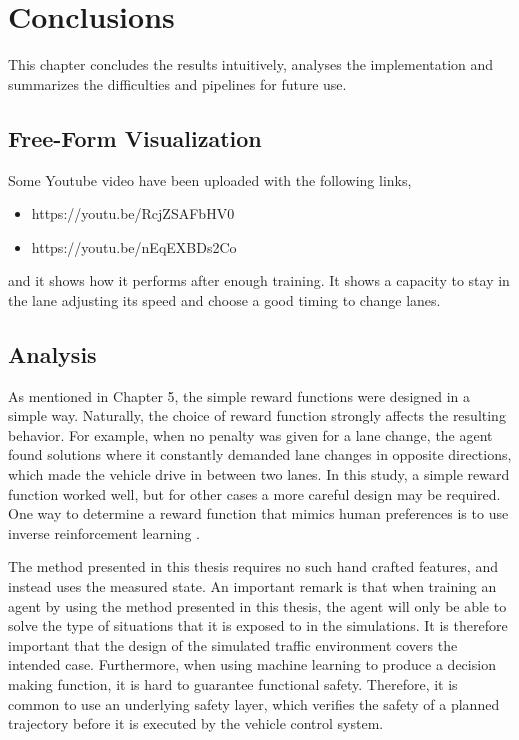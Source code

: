 \chapter{Conclusions}

This chapter concludes the results intuitively, analyses the implementation and summarizes the difficulties and pipelines for future use.

\section{Free-Form Visualization}

Some Youtube video have been uploaded with the following links,

\begin{itemize}
	\item https://youtu.be/RcjZSAFbHV0 
	\item https://youtu.be/nEqEXBDs2Co 
\end{itemize}

and it shows how it performs after enough training. It shows a capacity to stay in the lane adjusting its speed and choose a good timing to change lanes.

\section{Analysis}

As mentioned in Chapter 5, the simple reward functions were designed in a simple way. Naturally, the choice of reward function strongly affects the resulting behavior. For example, when no penalty was given for a lane change, the agent found solutions where it constantly demanded lane changes in opposite directions, which made the vehicle drive in between two lanes. In this study, a simple reward function worked well, but for other cases a more careful design may be required. One way to determine a reward function that mimics human preferences is to use inverse reinforcement learning \cite{IRL}.

The method presented in this thesis requires no such hand crafted features, and instead uses the measured state. An important remark is that when training an agent by using the method presented in this thesis, the agent will only be able to solve the type of situations that it is exposed to in the simulations. It is therefore important that the design of the simulated traffic environment covers the intended case. Furthermore, when using machine learning to produce a decision making function, it is hard to guarantee functional safety. Therefore, it is common to use an underlying safety layer, which verifies the safety of a planned trajectory before it is executed by the vehicle control system.

